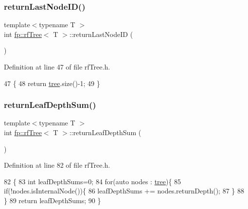 \subsubsection{\texorpdfstring{return\+Last\+Node\+I\+D()}{returnLastNodeID()}\hspace{0.1cm}{\footnotesize\ttfamily [2/2]}}
{\footnotesize\ttfamily template$<$typename T $>$ \\
int \hyperlink{classfp_1_1rfTree}{fp\+::rf\+Tree}$<$ T $>$\+::return\+Last\+Node\+ID (\begin{DoxyParamCaption}{ }\end{DoxyParamCaption})\hspace{0.3cm}{\ttfamily [inline]}}



Definition at line 47 of file rf\+Tree.\+h.


\begin{DoxyCode}
47                                              \{
48                     \textcolor{keywordflow}{return} \hyperlink{classtree}{tree}.size()-1;
49                 \}
\end{DoxyCode}
\mbox{\label{classfp_1_1rfTree_a7e0126c03547b4e6ed25b1c452255bbe}} 
\subsubsection{\texorpdfstring{return\+Leaf\+Depth\+Sum()}{returnLeafDepthSum()}\hspace{0.1cm}{\footnotesize\ttfamily [1/2]}}
{\footnotesize\ttfamily template$<$typename T $>$ \\
int \hyperlink{classfp_1_1rfTree}{fp\+::rf\+Tree}$<$ T $>$\+::return\+Leaf\+Depth\+Sum (\begin{DoxyParamCaption}{ }\end{DoxyParamCaption})\hspace{0.3cm}{\ttfamily [inline]}}



Definition at line 82 of file rf\+Tree.\+h.


\begin{DoxyCode}
82                                                \{
83                     \textcolor{keywordtype}{int} leafDepthSums=0;
84                     \textcolor{keywordflow}{for}(\textcolor{keyword}{auto} nodes : \hyperlink{classtree}{tree})\{
85                         \textcolor{keywordflow}{if}(!nodes.isInternalNode())\{
86                             leafDepthSums += nodes.returnDepth();
87                         \}
88                     \}
89                     \textcolor{keywordflow}{return} leafDepthSums;
90                 \}
\end{DoxyCode}
\mbox{\label{classfp_1_1rfTree_a7e0126c03547b4e6ed25b1c452255bbe}} 
